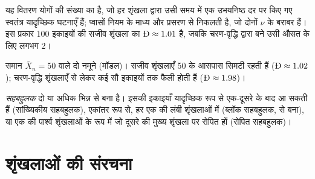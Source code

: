 \admitted

यह वितरण योगों की संख्या का है, जो हर शृंखला द्वारा उसी समय में एक उभयनिष्ठ दर पर
किए गए स्वतंत्र यादृच्छिक घटनाएँ हैं;  प्वासों नियम के माध्य और प्रसरण से निकलती है,
जो दोनों $\nu$ के बराबर हैं। इस प्रकार 100 इकाइयों की सजीव शृंखला का $\text{\DH} \approx 1.01$ है, जबकि
चरण-वृद्धि द्वारा बने उसी औसत के लिए लगभग 2।
\begin{omfigure}

{\small समान $\bar X_n = 50$ वाले दो नमूने (मॉडल)। सजीव शृंखलाएँ 50 के आसपास सिमटी रहती हैं ($\text{\DH}
\approx 1.02$); चरण-वृद्धि शृंखलाएँ  से लेकर कई सौ इकाइयों तक फैली होती हैं ($\text{\DH} \approx
1.98$)।}
\end{omfigure}

\begin{definition}[सहबहुलक]\label{def:b2:polymer-synthesis:copolymer}
\emph{सहबहुलक} दो या अधिक भिन्न  से बना  है। इसकी इकाइयाँ
यादृच्छिक रूप से एक-दूसरे के बाद आ सकती हैं (सांख्यिकीय सहबहुलक), एकांतर रूप से, हर एक की लंबी शृंखलाओं में (ब्लॉक
सहबहुलक,  से बना), या एक की पार्श्व शृंखलाओं के रूप में जो दूसरे की मुख्य शृंखला पर रोपित हों
(रोपित सहबहुलक)।
\end{definition}

\section{शृंखलाओं की संरचना}

